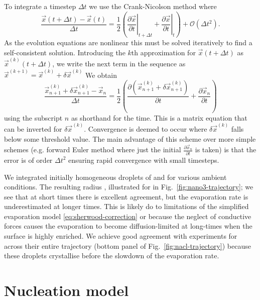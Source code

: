 \documentclass[11pt,twoside]{report}
\begin{document}
To integrate a timestep $\Delta t$ we use the Crank-Nicolson \cite{CrankMPCPS1947} method where
\begin{equation*}
  \frac{\vec{x}(t + \Delta t) - \vec{x}(t)}{\Delta t}
  =
  \frac{1}{2}
  \left(
  \left. \frac{\partial \vec{x}}{\partial t} \right|_{t + \Delta t}
  +
  \left. \frac{\partial \vec{x}}{\partial t} \right|_t
  \right)
  + \mathcal{O}(\Delta t^2).
\end{equation*}
As the evolution equations are nonlinear this must be solved iteratively to find a self-consistent solution.
Introducing the $k$th approximation for $\vec{x}(t + \Delta t)$ as $\vec{x}^{(k)}(t + \Delta t)$, we write the next term in the sequence as $\vec{x}^{(k+1)} = \vec{x}^{(k)} + \delta \vec{x}^{(k)}$
We obtain
\begin{equation*}
  \frac{\vec{x}_{n+1}^{(k)} + \delta\vec{x}_{n+1}^{(k)} - \vec{x}_n}{\Delta t}
  =
  \frac{1}{2}
  \left(
  \frac{\partial (\vec{x}_{n+1}^{(k)} + \delta\vec{x}_{n+1}^{(k)})}{\partial t}
  +
  \frac{\partial \vec{x}_n}{\partial t}
  \right)
\end{equation*}
using the subscript $n$ as shorthand for the time.
This is a matrix equation that can be inverted for $\delta \vec{x}^{(k)}$.
Convergence is deemed to occur where $\delta \vec{x}^{(k)}$ falls below some threshold value.
The main advantage of this scheme over more simple schemes (e.g. forward Euler method where just the initial $\frac{\partial \vec{x}_n}{\partial t}$ is taken) is that the error is of order $\Delta t^2$ ensuring rapid convergence with small timesteps.

We integrated initially homogeneous droplets of  and  for various ambient conditions.
The resulting radius , illustrated for  in Fig.\ \ref{fig:nano3-trajectory}; we see that at short times there is excellent agreement, but the evaporation rate is underestimated at longer times.
This is likely do to limitations of the simplified evaporation model \eqref{eq:sherwood-correction} or because the neglect of conductive forces causes the evaporation to become diffusion-limited at long-times when the surface is highly enriched.
We achieve good agreement with experiments for  across their entire trajectory (bottom panel of Fig.\ \ref{fig:nacl-trajectory}) because these droplets crystallise before the slowdown of the evaporation rate.

\section{Nucleation model}
\label{sec:nucleation}
\end{document}
